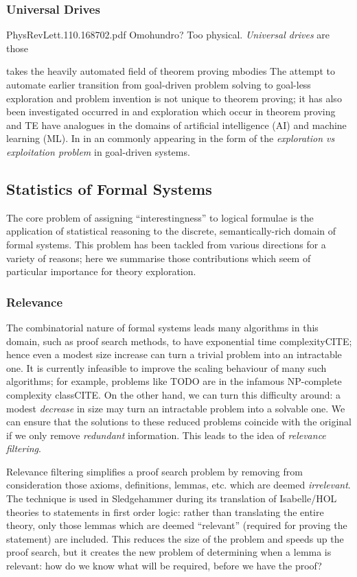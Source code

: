 \documentclass[]{article}
\begin{document}
\subsubsection{Universal Drives}

PhysRevLett.110.168702.pdf
Omohundro? Too physical.
\emph{Universal drives} are those

 takes the heavily automated field of theorem proving   mbodies The attempt to automate earlier transition from goal-driven problem solving to goal-less exploration and problem invention is not unique to theorem proving; it has also been investigated occurred in  and exploration which occur in theorem proving and TE have analogues in the domains of artificial intelligence (AI) and machine learning (ML). In  in an commonly appearing in the form of the \emph{exploration vs exploitation problem} in goal-driven systems.

\subsection{Statistics of Formal Systems}

The core problem of assigning ``interestingness'' to logical formulae is the application of statistical reasoning to the discrete, semantically-rich domain of formal systems. This problem has been tackled from various directions for a variety of reasons; here we summarise those contributions which seem of particular importance for theory exploration.

\subsubsection{Relevance}

The combinatorial nature of formal systems leads many algorithms in this domain, such as proof search methods, to have exponential time complexityCITE; hence even a modest size increase can turn a trivial problem into an intractable one. It is currently infeasible to improve the scaling behaviour of many such algorithms; for example, problems like TODO are in the infamous NP-complete complexity classCITE. On the other hand, we can turn this difficulty around: a modest \emph{decrease} in size may turn an intractable problem into a solvable one. We can ensure that the solutions to these reduced problems coincide with the original if we only remove \emph{redundant} information. This leads to the idea of \emph{relevance filtering}.

Relevance filtering simplifies a proof search problem by removing from consideration those axioms, definitions, lemmas, etc. which are deemed \emph{irrelevant}. The technique is used in Sledgehammer during its translation of Isabelle/HOL theories to statements in first order logic: rather than translating the entire theory, only those lemmas which are deemed ``relevant'' (required for proving the statement) are included. This reduces the size of the problem and speeds up the proof search, but it creates the new problem of determining when a lemma is relevant: how do we know what will be required, before we have the proof?
\end{document}
